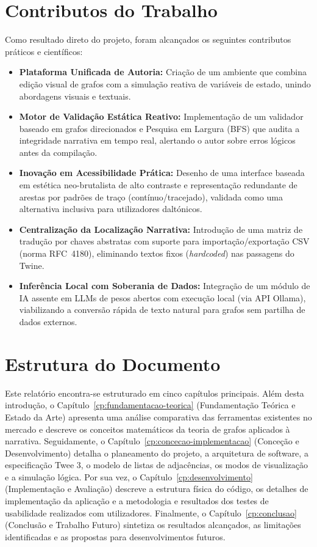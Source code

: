 \section{Contributos do Trabalho}
\label{sec:contributos-trabalho}
Como resultado direto do projeto, foram alcançados os seguintes contributos práticos e científicos:
\begin{itemize}
    \item \textbf{Plataforma Unificada de Autoria:} Criação de um ambiente que combina edição visual de grafos com a simulação reativa de variáveis de estado, unindo abordagens visuais e textuais.
    \item \textbf{Motor de Validação Estática Reativo:} Implementação de um validador baseado em grafos direcionados e Pesquisa em Largura (BFS) que audita a integridade narrativa em tempo real, alertando o autor sobre erros lógicos antes da compilação.
    \item \textbf{Inovação em Acessibilidade Prática:} Desenho de uma interface baseada em estética neo-brutalista de alto contraste e representação redundante de arestas por padrões de traço (contínuo/tracejado), validada como uma alternativa inclusiva para utilizadores daltónicos.
    \item \textbf{Centralização da Localização Narrativa:} Introdução de uma matriz de tradução por chaves abstratas com suporte para importação/exportação CSV (norma RFC~4180), eliminando textos fixos (\textit{hardcoded}) nas passagens do Twine.
    \item \textbf{Inferência Local com Soberania de Dados:} Integração de um módulo de IA assente em LLMs de pesos abertos com execução local (via API Ollama), viabilizando a conversão rápida de texto natural para grafos sem partilha de dados externos.
\end{itemize}

\section{Estrutura do Documento}
Este relatório encontra-se estruturado em cinco capítulos principais. Além desta introdução, o Capítulo~\ref{cp:fundamentacao-teorica} (Fundamentação Teórica e Estado da Arte) apresenta uma análise comparativa das ferramentas existentes no mercado e descreve os conceitos matemáticos da teoria de grafos aplicados à narrativa. Seguidamente, o Capítulo~\ref{cp:concecao-implementacao} (Conceção e Desenvolvimento) detalha o planeamento do projeto, a arquitetura de software, a especificação Twee 3, o modelo de listas de adjacências, os modos de visualização e a simulação lógica. Por sua vez, o Capítulo~\ref{cp:desenvolvimento} (Implementação e Avaliação) descreve a estrutura física do código, os detalhes de implementação da aplicação e a metodologia e resultados dos testes de usabilidade realizados com utilizadores. Finalmente, o Capítulo~\ref{cp:conclusao} (Conclusão e Trabalho Futuro) sintetiza os resultados alcançados, as limitações identificadas e as propostas para desenvolvimentos futuros.